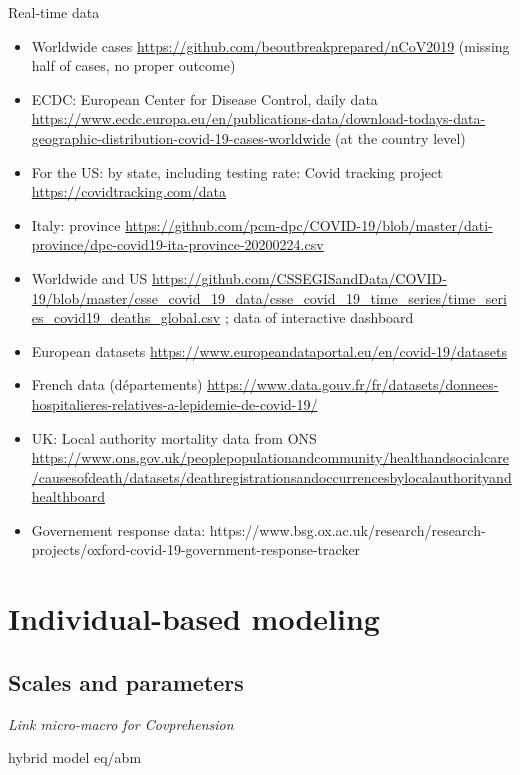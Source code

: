 \documentclass[10pt]{article}
\begin{document}
Real-time data

\begin{itemize}
	\item Worldwide cases \cite{xu2020epidemiological} \url{https://github.com/beoutbreakprepared/nCoV2019} (missing half of cases, no proper outcome)
	\item ECDC: European Center for Disease Control, daily data \url{https://www.ecdc.europa.eu/en/publications-data/download-todays-data-geographic-distribution-covid-19-cases-worldwide} (at the country level)
	\item For the US: by state, including testing rate: Covid tracking project \url{https://covidtracking.com/data}
	\item Italy: province \url{https://github.com/pcm-dpc/COVID-19/blob/master/dati-province/dpc-covid19-ita-province-20200224.csv}
	\item Worldwide and US \url{https://github.com/CSSEGISandData/COVID-19/blob/master/csse\_covid\_19\_data/csse\_covid\_19\_time\_series/time\_series\_covid19\_deaths\_global.csv} ; data of interactive dashboard \cite{dong2020interactive}
	\item European datasets \url{https://www.europeandataportal.eu/en/covid-19/datasets}
	\item French data (d{\'e}partements) \url{https://www.data.gouv.fr/fr/datasets/donnees-hospitalieres-relatives-a-lepidemie-de-covid-19/}
	\item UK: Local authority mortality data from ONS \url{https://www.ons.gov.uk/peoplepopulationandcommunity/healthandsocialcare/causesofdeath/datasets/deathregistrationsandoccurrencesbylocalauthorityandhealthboard}
	\item Governement response data: https://www.bsg.ox.ac.uk/research/research-projects/oxford-covid-19-government-response-tracker
\end{itemize}


	
	
\section{Individual-based modeling}

\subsection{Scales and parameters}

\textit{Link micro-macro for Covprehension}

\cite{hunter2020hybrid} hybrid model eq/abm
\end{document}
